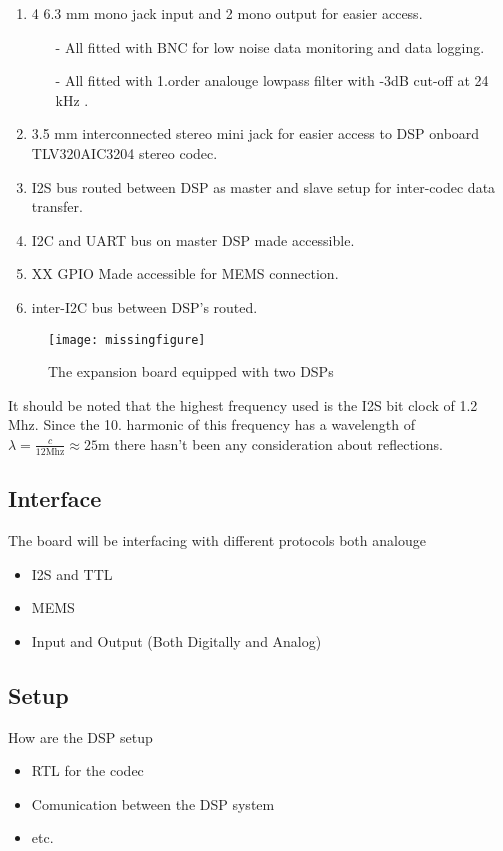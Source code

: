 \begin{enumerate}
	\item 4 6.3 mm mono jack input and 2 mono output for easier access.
	\begin{itemize}
		\item[-] All fitted with BNC for low noise data monitoring and data logging.
		\item[-] All fitted with 1.order analouge lowpass filter with -3dB cut-off at 24 kHz .
	\end{itemize}
	\item 3.5 mm interconnected stereo mini jack for easier access to DSP onboard TLV320AIC3204 stereo codec.
	\item I2S bus routed between DSP as master and slave setup for inter-codec data transfer.
	\item I2C and UART bus on master DSP made accessible.
	\item XX GPIO Made accessible for MEMS connection.
	\item inter-I2C bus between DSP's routed. 
\end{enumerate}

\begin{figure}
	\centering
	\texttt{[image: missingfigure]}	
	\caption{The expansion board equipped with two DSPs}
	\label{fig:PCBboard}
\end{figure}

It should be noted that the highest frequency used is the I2S bit clock of 1.2 Mhz. Since the 10. harmonic of this frequency has a wavelength of $\lambda=\frac{c}{12 \text{Mhz}}\approx25\text{m}$ there hasn't been any consideration about reflections.






\subsection{Interface}

The board will be interfacing with different protocols both analouge 

\begin{itemize}
	\item I2S and TTL
	\item MEMS
	\item Input and Output (Both Digitally and Analog)
\end{itemize}



\subsection*{Setup}

How are the DSP setup

\begin{itemize}
	\item RTL for the codec
	\item Comunication between the DSP system
	\item etc.
\end{itemize}



